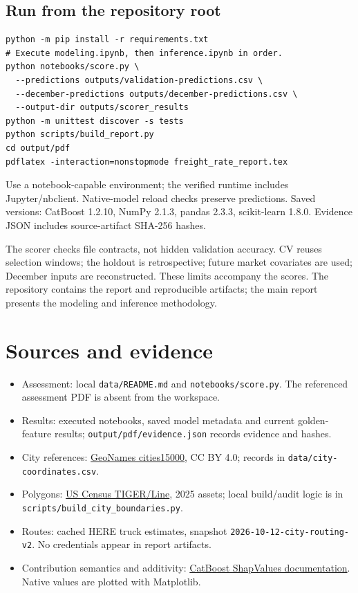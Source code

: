 \documentclass[10pt,a4paper]{article}
\newcommand{\code}[1]{\nolinkurl{#1}}
\begin{document}
\subsection*{Run from the repository root}
\begin{lstlisting}
python -m pip install -r requirements.txt
# Execute modeling.ipynb, then inference.ipynb in order.
python notebooks/score.py \
  --predictions outputs/validation-predictions.csv \
  --december-predictions outputs/december-predictions.csv \
  --output-dir outputs/scorer_results
python -m unittest discover -s tests
python scripts/build_report.py
cd output/pdf
pdflatex -interaction=nonstopmode freight_rate_report.tex
\end{lstlisting}
Use a notebook-capable environment; the verified runtime includes Jupyter/nbclient. Native-model reload checks preserve predictions. Saved versions: CatBoost 1.2.10, NumPy 2.1.3, pandas 2.3.3, scikit-learn 1.8.0. Evidence JSON includes source-artifact SHA-256 hashes.

The scorer checks file contracts, not hidden validation accuracy. CV reuses selection windows; the holdout is retrospective; future market covariates are used; December inputs are reconstructed. These limits accompany the scores. The repository contains the report and reproducible artifacts; the main report presents the modeling and inference methodology.

\newpage
\section{Sources and evidence}
\begin{itemize}
\item Assessment: local \code{data/README.md} and \code{notebooks/score.py}. The referenced assessment PDF is absent from the workspace.
\item Results: executed notebooks, saved model metadata and current golden-feature results; \code{output/pdf/evidence.json} records evidence and hashes.
\item City references: \href{https://download.geonames.org/export/dump/}{GeoNames cities15000}, CC BY 4.0; records in \code{data/city-coordinates.csv}.
\item Polygons: \href{https://www.census.gov/geographies/mapping-files/time-series/geo/tiger-line-file.html}{US Census TIGER/Line}, 2025 assets; local build/audit logic is in \code{scripts/build_city_boundaries.py}.
\item Routes: cached HERE truck estimates, snapshot \code{2026-10-12-city-routing-v2}. No credentials appear in report artifacts.
\item Contribution semantics and additivity: \href{https://catboost.ai/docs/en/concepts/shap-values}{CatBoost ShapValues documentation}. Native values are plotted with Matplotlib.
\end{itemize}
\end{document}
